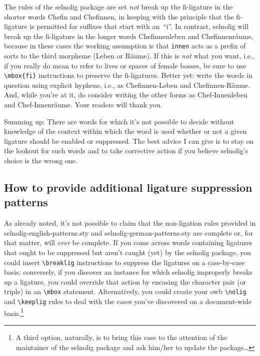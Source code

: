 \documentclass[11pt]{article}
\newcommand{\pkg}[1]{\textsf{#1}}
\newcommand{\opt}[1]{\texttt{#1}}
\newcommand{\cmmd}[1]{\texttt{\textbackslash #1}}
\begin{document}
The rules of the \pkg{selnolig} package are set \emph{not} break up the fi-ligature in the shorter words Chefin and Chefinnen, in keeping with the principle that the fi-ligature is permitted for suffixes that start with an~\enquote{i}. In contrast, \pkg{selnolig} will break up the fi-ligature in the longer words Chefinnenleben and Chefinnenräume, because in these cases the working assumption is that \opt{innen} acts as a prefix of sorts to the third morpheme (Leben or Räume). If this is \emph{not} what you want, i.e., if you really do mean to refer to lives or spaces of female bosses, be sure to use \Verb+\mbox{fi}+ instructions to preserve the fi-ligatures. Better yet: write the words in question using explicit hyphens, i.e., as Chefinnen-Leben and Chefinnen-Räume. And, while you're at it, do consider writing the other forms as Chef-Innenleben and Chef-Innenräume. Your readers will thank you.

Summing up: There are words for which it's not possible to decide without knowledge of the context within which the word is used whether or not a given ligature should be enabled or suppressed. The best advice I can give is to stay on the lookout for such words and to take corrective action if you believe \pkg{selnolig}'s choice is the wrong one.



\subsection{How to provide additional ligature suppression patterns}

As already noted, it's not possible to claim that the non-ligation rules provided in \pkg{selnolig-english-patterns.sty} and \pkg{selnolig-german-patterns.sty} are complete or, for that matter, will \emph{ever} be complete. If you come across words containing ligatures that ought to be suppressed but aren't caught (yet) by the \pkg{selnolig} package, you could insert \cmmd{breaklig} instructions to suppress the ligatures on a case-by-case basis; conversely, if you discover an instance for which \pkg{selnolig} improperly breaks up a ligature, you could override that action by encasing the character pair (or triple) in an \cmmd{mbox} statement. Alternatively, you could create your owb \cmmd{nolig} and \cmmd{keeplig} rules to deal with the cases you've discovered on a document-wide basis.\footnote{A third option, naturally, is to bring this case to the attention of the maintainer of the \pkg{selnolig} package and ask him/her to update the package\dots}
\end{document}
